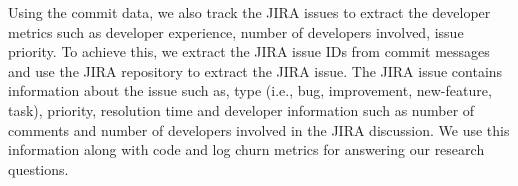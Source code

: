 Using the commit data, we also track the JIRA issues to extract the developer metrics such as developer experience, number of developers involved, issue priority. To achieve this, we extract the JIRA issue IDs from commit messages and use the JIRA repository to extract the JIRA issue. The JIRA issue contains information about the issue such as, type (i.e., bug, improvement, new-feature, task), priority, resolution time and developer information such as number of comments and number of developers involved in the JIRA discussion. We use this information along with code and log churn metrics for answering our research questions. 




 







